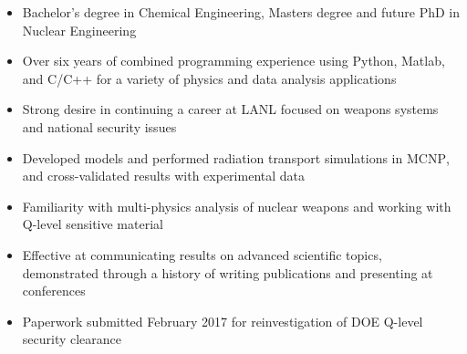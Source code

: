 \documentclass[a4paper,10pt]{article}
\begin{document}
\begin{itemize}[leftmargin=.9in,rightmargin=.875in,itemsep=1.6mm]

\item Bachelor's degree in Chemical Engineering, Masters degree and future PhD in Nuclear Engineering
\item Over six years of combined programming experience using Python, Matlab, and C/C++ for a variety of physics and data analysis applications
\item Strong desire in continuing a career at LANL focused on weapons systems and national security issues
\item Developed models and performed radiation transport simulations in \textsc{MCNP}, and cross-validated results with experimental data
\item Familiarity with multi-physics analysis of nuclear weapons and working with Q-level sensitive material
\item Effective at communicating results on advanced scientific topics, demonstrated through a history of writing publications and presenting at conferences
\item Paperwork submitted February 2017 for reinvestigation of DOE Q-level security clearance


\end{itemize} 
\end{document}
